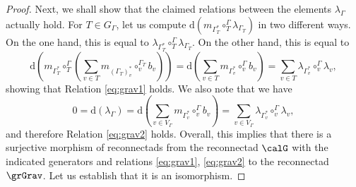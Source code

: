 \begin{proof}
Next, we shall show that the claimed relations between the elements $\lambda_{\Gamma}$ actually hold. For $T\in G_\Gamma$, let us compute $\mathrm{d}(m_{\Gamma^*_T}\circ_T^{\Gamma} \lambda_{\Gamma_T})$ in two different ways. On the one hand, this is equal to $\lambda_{\Gamma^*_T}\circ_T^{\Gamma} \lambda_{\Gamma_T}$. On the other hand, this is equal to
 \[
\mathrm{d}\left(m_{\Gamma^*_T}\circ_T^{\Gamma} \left(\sum_{v\in T} m_{(\Gamma_T)^*_v}\circ_v^{\Gamma_T} b_v\right)\right)
= \mathrm{d}\left(\sum_{v\in T} m_{\Gamma^*_v}\circ_v^{\Gamma} b_v\right)=\sum_{v \in T} \lambda_{\Gamma^*_v} \circ_v^{\Gamma} \lambda_v,
 \]
showing that Relation \eqref{eq:grav1} holds. We also note that we have
 \[
0=\mathrm{d}(\lambda_{\Gamma})=\mathrm{d}\left(\sum_{v\in V_\Gamma}m_{\Gamma^*_v}\circ_v^{\Gamma} b_v\right)=\sum_{v\in V_\Gamma}\lambda_{\Gamma^*_v}\circ_v^{\Gamma} \lambda_v,
 \] 
and therefore Relation \eqref{eq:grav2} holds. Overall, this implies that there is a surjective morphism of reconnectads from the reconnectad $\calG$ with the indicated generators and relations \eqref{eq:grav1}, \eqref{eq:grav2} to the reconnectad $\grGrav$. Let us establish that it is an isomorphism. 


\end{proof}
